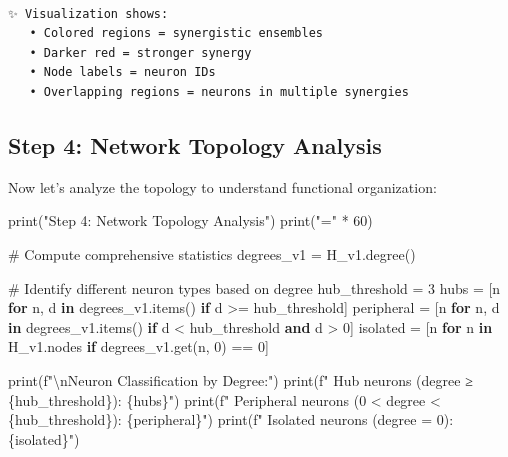 \documentclass[
  11pt,
  letterpaper,
  oneside,
  openany]{book}
\newenvironment{Shaded}{\begin{snugshade}}{\end{snugshade}}
\newcommand{\BuiltInTok}[1]{\textcolor[rgb]{0.00,0.23,0.31}{#1}}
\newcommand{\CharTok}[1]{\textcolor[rgb]{0.13,0.47,0.30}{#1}}
\newcommand{\CommentTok}[1]{\textcolor[rgb]{0.37,0.37,0.37}{#1}}
\newcommand{\ControlFlowTok}[1]{\textcolor[rgb]{0.00,0.23,0.31}{\textbf{#1}}}
\newcommand{\DecValTok}[1]{\textcolor[rgb]{0.68,0.00,0.00}{#1}}
\newcommand{\KeywordTok}[1]{\textcolor[rgb]{0.00,0.23,0.31}{\textbf{#1}}}
\newcommand{\NormalTok}[1]{\textcolor[rgb]{0.00,0.23,0.31}{#1}}
\newcommand{\OperatorTok}[1]{\textcolor[rgb]{0.37,0.37,0.37}{#1}}
\newcommand{\SpecialCharTok}[1]{\textcolor[rgb]{0.37,0.37,0.37}{#1}}
\newcommand{\SpecialStringTok}[1]{\textcolor[rgb]{0.13,0.47,0.30}{#1}}
\newcommand{\StringTok}[1]{\textcolor[rgb]{0.13,0.47,0.30}{#1}}
\begin{document}
\begin{verbatim}

✨ Visualization shows:
   • Colored regions = synergistic ensembles
   • Darker red = stronger synergy
   • Node labels = neuron IDs
   • Overlapping regions = neurons in multiple synergies
\end{verbatim}

\subsection{Step 4: Network Topology
Analysis}\label{step-4-network-topology-analysis}

Now let's analyze the topology to understand functional organization:

\begin{Shaded}
\begin{Highlighting}[]
\BuiltInTok{print}\NormalTok{(}\StringTok{"Step 4: Network Topology Analysis"}\NormalTok{)}
\BuiltInTok{print}\NormalTok{(}\StringTok{"="} \OperatorTok{*} \DecValTok{60}\NormalTok{)}

\CommentTok{\# Compute comprehensive statistics}
\NormalTok{degrees\_v1 }\OperatorTok{=}\NormalTok{ H\_v1.degree()}

\CommentTok{\# Identify different neuron types based on degree}
\NormalTok{hub\_threshold }\OperatorTok{=} \DecValTok{3}
\NormalTok{hubs }\OperatorTok{=}\NormalTok{ [n }\ControlFlowTok{for}\NormalTok{ n, d }\KeywordTok{in}\NormalTok{ degrees\_v1.items() }\ControlFlowTok{if}\NormalTok{ d }\OperatorTok{\textgreater{}=}\NormalTok{ hub\_threshold]}
\NormalTok{peripheral }\OperatorTok{=}\NormalTok{ [n }\ControlFlowTok{for}\NormalTok{ n, d }\KeywordTok{in}\NormalTok{ degrees\_v1.items() }\ControlFlowTok{if}\NormalTok{ d }\OperatorTok{\textless{}}\NormalTok{ hub\_threshold }\KeywordTok{and}\NormalTok{ d }\OperatorTok{\textgreater{}} \DecValTok{0}\NormalTok{]}
\NormalTok{isolated }\OperatorTok{=}\NormalTok{ [n }\ControlFlowTok{for}\NormalTok{ n }\KeywordTok{in}\NormalTok{ H\_v1.nodes }\ControlFlowTok{if}\NormalTok{ degrees\_v1.get(n, }\DecValTok{0}\NormalTok{) }\OperatorTok{==} \DecValTok{0}\NormalTok{]}

\BuiltInTok{print}\NormalTok{(}\SpecialStringTok{f"}\CharTok{\textbackslash{}n}\SpecialStringTok{Neuron Classification by Degree:"}\NormalTok{)}
\BuiltInTok{print}\NormalTok{(}\SpecialStringTok{f"  Hub neurons (degree ≥ }\SpecialCharTok{\{}\NormalTok{hub\_threshold}\SpecialCharTok{\}}\SpecialStringTok{): }\SpecialCharTok{\{}\NormalTok{hubs}\SpecialCharTok{\}}\SpecialStringTok{"}\NormalTok{)}
\BuiltInTok{print}\NormalTok{(}\SpecialStringTok{f"  Peripheral neurons (0 \textless{} degree \textless{} }\SpecialCharTok{\{}\NormalTok{hub\_threshold}\SpecialCharTok{\}}\SpecialStringTok{): }\SpecialCharTok{\{}\NormalTok{peripheral}\SpecialCharTok{\}}\SpecialStringTok{"}\NormalTok{)}
\BuiltInTok{print}\NormalTok{(}\SpecialStringTok{f"  Isolated neurons (degree = 0): }\SpecialCharTok{\{}\NormalTok{isolated}\SpecialCharTok{\}}\SpecialStringTok{"}\NormalTok{)}


\end{Highlighting}
\end{Shaded}
\end{document}
